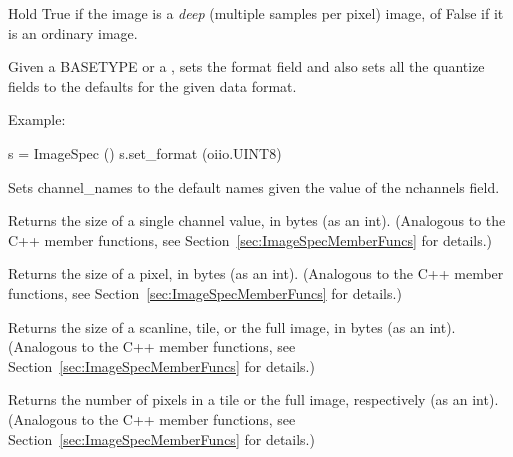 Hold {\cf True} if the image is a \emph{deep} (multiple samples per pixel)
image, of {\cf False} if it is an ordinary image.
\apiend

Given a {\cf BASETYPE} or a \TypeDesc, sets the {\cf format} field and
also sets all the {\cf quantize} fields to the defaults for the given
data format.

\noindent Example:
\begin{code}
    s = ImageSpec ()
    s.set_format (oiio.UINT8)
\end{code}
\apiend

Sets {\cf channel_names} to the default names given the value of
the {\cf nchannels} field.
\apiend

Returns the size of a single channel value, in bytes (as an
{\cf int}).
(Analogous to the C++ member functions, see 
Section~\ref{sec:ImageSpecMemberFuncs} for details.)
\apiend

Returns the size of a pixel, in bytes (as an {\cf int}).
(Analogous to the C++ member functions, see 
Section~\ref{sec:ImageSpecMemberFuncs} for details.)
\apiend

Returns the size of a scanline, tile, or the full image, in bytes (as an
{\cf int}). (Analogous to the C++ member functions, see 
Section~\ref{sec:ImageSpecMemberFuncs} for details.)
\apiend

Returns the number of pixels in a tile or the full image, respectively
(as an {\cf int}). (Analogous to the C++ member functions, see 
Section~\ref{sec:ImageSpecMemberFuncs} for details.)
\apiend

